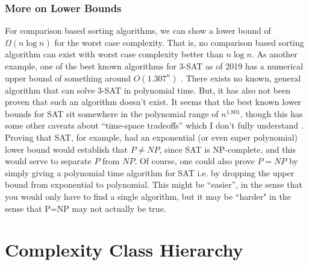 \documentclass[10pt,a4paper]{article}
\begin{document}
\subsubsection*{More on Lower Bounds}

For comparison based sorting algorithms, we can show a lower bound of $\Omega(n \log{n})$ for the worst case complexity. That is, no comparison based sorting algorithm can exist with worst case complexity better than $n \log{n}$. As another example, one of the best known algorithms for 3-SAT as of 2019 has a numerical upper bound of something around $O(1.307^n)$ \cite{2019fasterkSAT}. There exists no known, general algorithm that can solve 3-SAT in polynomial time. But, it has also not been proven that such an algorithm doesn't exist. It seems that the best known lower bounds for SAT sit somewhere in the polynomial range of $n^{1.801}$, though this has some other caveats about ``time-space tradeoffs'' which I don't fully understand \cite{SE3satlowerbounds}. Proving that SAT, for example, had an exponential (or even super polynomial) lower bound would establish that $P \neq NP$, since SAT is NP-complete, and this would serve to separate $P$ from $NP$. Of course, one could also prove $P=NP$ by simply giving a polynomial time algorithm for SAT i.e. by dropping the upper bound from exponential to polynomial. This might be ``easier'', in the sense that you would only have to find a single algorithm, but it may be ``harder" in the sense that P=NP may not actually be true.





\section{Complexity Class Hierarchy}
\end{document}
